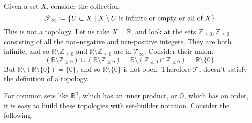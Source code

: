     \begin{example}
      Given a set $X$, consider the collection 
      \begin{equation}
        \T_\infty \coloneqq \{U \subset X \mid X \setminus U \text{ is infinite or empty or all of }X \}
      \end{equation}
      This is not a topology. Let us take $X = \mathbb{R}$, and look at the sets $\mathbb{Z}_{\geq 0}, \mathbb{Z}_{\leq 0}$ consisting of all the non-negative and non-positive integers. They are both infinite, and so $\mathbb{R} \setminus \mathbb{Z}_{\geq 0}$ and $\mathbb{R} \setminus \mathbb{Z}_{\leq 0}$ are in $\mathcal{T}_\infty$. Consider their union. 
      \begin{equation}
        (\mathbb{R} \setminus \mathbb{Z}_{\geq 0}) \cup (\mathbb{R} \setminus \mathbb{Z}_{\leq 0}) = \mathbb{R} \setminus (\mathbb{Z}_{\geq 0} \cap \mathbb{Z}_{\leq 0}) = \mathbb{R} \setminus \{0\}
      \end{equation}
      But $\mathbb{R} \setminus (\mathbb{R} \setminus \{0\}) = \{0\}$, and so $\mathbb{R} \setminus \{0\}$ is not open. Therefore $\mathcal{T}_c$ doesn't satisfy the definition of a topology. 
    \end{example}

    For common sets like $\mathbb{R}^n$, which has an inner product, or $\mathbb{Q}$, which has an order, it is easy to build these topologies with set-builder notation. Consider the following. 

